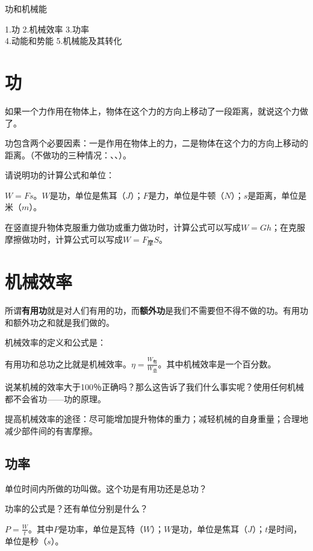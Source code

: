 \documentclass[12pt]{exam}
\newcommand{\keti}{功和机械能}
\newcommand{\zhongdian}{1.功 2.机械效率 3.功率  \\4.动能和势能 5.机械能及其转化}
\begin{document}
\vspace*{80pt}
\keti \par
\zhongdian \par
\section{功}
如果一个力作用在物体上，物体在这个力的方向上移动了一段距离，就说这个力做了\answerline*[功]。

功包含两个必要因素：一是作用在物体上的力，二是物体在这个力的方向上移动的距离。（不做功的三种情况：、、）。

请说明功的计算公式和单位：
\begin{solutionorbox}[8ex]
$W=Fs$。$W$是功，单位是焦耳（$J$）；$F$是力，单位是牛顿（$N$）；$s$是距离，单位是米（$m$）。
\end{solutionorbox}


在竖直提升物体克服重力做功或重力做功时，计算公式可以写成$W=Gh$；在克服摩擦做功时，计算公式可以写成$W=F_\textrm{摩}S$。



\section{机械效率}
所谓\textbf{有用功}就是对人们有用的功，而\textbf{额外功}是我们不需要但不得不做的功。有用功和额外功之和就是我们做的\answerline[总功]。

机械效率的定义和公式是：
\begin{solutionorbox}[6ex]
有用功和总功之比就是机械效率。$\eta =\frac{W_\textrm{有}}{W_\textrm{总}} $。其中机械效率是一个百分数。
\end{solutionorbox}

说某机械的效率大于100％正确吗？那么这告诉了我们什么事实呢？使用任何机械都不会省功——功的原理。

提高机械效率的途径：尽可能增加提升物体的重力；减轻机械的自身重量；合理地减少部件间的有害摩擦。


\subsection{功率}
单位时间内所做的功叫做\answerline[功率]。这个功是有用功还是总功？

功率的公式是？还有单位分别是什么？
\begin{solutionorbox}[6ex]
$P=\frac{W}{t}$。其中$P$是功率，单位是瓦特（$W$）；$W$是功，单位是焦耳（$J$）；$t$是时间，单位是秒（$s$）。
\end{solutionorbox}
\end{document}
